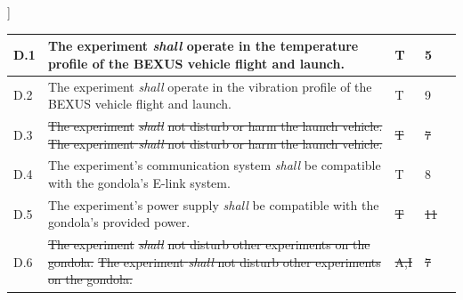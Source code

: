 ]\documentclass[a4paper,12pt,twoside]{article}
\providecommand{\DIFaddtex}[1]{{\protect\color{blue}\uwave{#1}}} %
\providecommand{\DIFdeltex}[1]{{\protect\color{red}\sout{#1}}}                      %
\providecommand{\DIFaddbegin}{} %
\providecommand{\DIFaddend}{} %
\providecommand{\DIFdelbegin}{} %
\providecommand{\DIFdelend}{} %
\providecommand{\DIFadd}[1]{\texorpdfstring{\DIFaddtex{#1}}{#1}} %
\providecommand{\DIFdel}[1]{\texorpdfstring{\DIFdeltex{#1}}{}} %
\newcommand{\DIFscaledelfig}{0.5}
\newlength{\DIFdelgraphicswidth} %
\newlength{\DIFdelgraphicsheight} %
\newcommand{\DIFaddincludegraphics}[2][]{{\color{blue}\fbox{\DIFOincludegraphics[#1]{#2}}}} %
\newcommand{\DIFdelincludegraphics}[2][]{%
\sbox{\DIFdelgraphicsbox}{\DIFOincludegraphics[#1]{#2}}%
\settoboxwidth{\DIFdelgraphicswidth}{\DIFdelgraphicsbox} %
\settoboxtotalheight{\DIFdelgraphicsheight}{\DIFdelgraphicsbox} %
\scalebox{\DIFscaledelfig}{%
\parbox[b]{\DIFdelgraphicswidth}{\usebox{\DIFdelgraphicsbox}\\[-\baselineskip] \rule{\DIFdelgraphicswidth}{0em}}\llap{\resizebox{\DIFdelgraphicswidth}{\DIFdelgraphicsheight}{%
\setlength{\unitlength}{\DIFdelgraphicswidth}%
\begin{picture}(1,1)%
\thicklines\linethickness{2pt} %
{\color[rgb]{1,0,0}\put(0,0){\framebox(1,1){}}}%
{\color[rgb]{1,0,0}\put(0,0){\line( 1,1){1}}}%
{\color[rgb]{1,0,0}\put(0,1){\line(1,-1){1}}}%
\end{picture}%
}\hspace*{3pt}}} %
} %
\DeclareRobustCommand{\DIFaddbegin}{\DIFOaddbegin \let\includegraphics\DIFaddincludegraphics} %
\DeclareRobustCommand{\DIFaddend}{\DIFOaddend \let\includegraphics\DIFOincludegraphics} %
\DeclareRobustCommand{\DIFdelbegin}{\DIFOdelbegin \let\includegraphics\DIFdelincludegraphics} %
\DeclareRobustCommand{\DIFdelend}{\DIFOaddend \let\includegraphics\DIFOincludegraphics} %
\begin{document}
\begin{longtable}[]{|m{}| m{} |m{} |m{}|m{}|}
\DIFaddend D.1  & The experiment \textit{shall} operate in the temperature profile of the BEXUS vehicle flight and launch.                                                                         &       \DIFaddbegin \DIFadd{A, }\DIFaddend T       & 5            &        \\ \hline
D.2  & The experiment \textit{shall} operate in the vibration profile of the BEXUS vehicle flight and launch.                                                                           &       \DIFaddbegin \DIFadd{A, }\DIFaddend T       & 9            &        \\ \hline
D.3  & \DIFdelbegin \DIFdel{The experiment }\textit{\DIFdel{shall}} %
\DIFdel{not disturb or harm the launch vehicle.                                                                                                            }\DIFdelend \DIFaddbegin \st{The experiment \textit{shall} not disturb or harm the launch vehicle.}\DIFadd{\textsuperscript{\ref{fn:unnecessary-requirement}}                                                                                                             }\DIFaddend &      \DIFdelbegin \DIFdel{T        }\DIFdelend \DIFaddbegin \DIFadd{-      }\DIFaddend & \DIFdelbegin \DIFdel{7            }\DIFdelend \DIFaddbegin \DIFadd{-          }\DIFaddend &        \\ \hline
D.4  & The experiment's communication system \textit{shall} be compatible with the gondola's E-link system.                                                                             &      \DIFaddbegin \DIFadd{A, }\DIFaddend T        & 8            &        \\ \hline
D.5  & The experiment's power supply \textit{shall
} be compatible with the gondola's provided power.                                                                                    &      \DIFdelbegin \DIFdel{T        }\DIFdelend \DIFaddbegin \DIFadd{A        }\DIFaddend &  \DIFdelbegin \DIFdel{11           }\DIFdelend \DIFaddbegin \DIFadd{-           }\DIFaddend &        \\ \hline
D.6  & \DIFdelbegin \DIFdel{The experiment }\textit{\DIFdel{shall}} %
\DIFdel{not disturb other experiments on the gondola.                                                                                                      }\DIFdelend \DIFaddbegin \st{The experiment \textit{shall} not disturb other experiments on the gondola.}\DIFadd{\textsuperscript{\ref{fn:unnecessary-requirement}}                                                                                                       }\DIFaddend &      \DIFdelbegin \DIFdel{A,I       }\DIFdelend \DIFaddbegin \DIFadd{-      }\DIFaddend & \DIFdelbegin \DIFdel{7            }\DIFdelend \DIFaddbegin \DIFadd{-           }\DIFaddend &        \\ \hline

\end{longtable}
\end{document}
